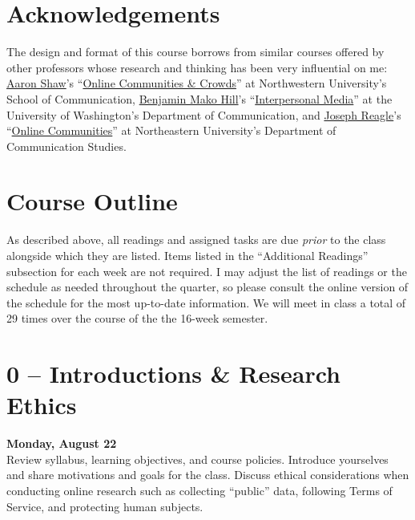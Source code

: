 \documentclass[10pt]{memoir}
\begin{document}
\section{Acknowledgements}
The design and format of this course borrows from similar courses offered by other professors whose research and thinking has been very influential on me: \href{http://aaronshaw.org/}{Aaron Shaw}'s ``\href{http://aaronshaw.org/teaching/2014/occ/syllabus/Shaw-occ-syllabus2014.pdf}{Online Communities \& Crowds}'' at Northwestern University's School of Communication, \href{https://mako.cc/academic/}{Benjamin Mako Hill}'s ``\href{http://wiki.communitydata.cc/Interpersonal_Media_(Fall_2015)}{Interpersonal Media}'' at the University of Washington's Department of Communication, and \href{http://reagle.org/joseph}{Joseph Reagle}'s ``\href{http://reagle.org/joseph/2014/oc/oc-syllabus-FA.html}{Online Communities}'' at Northeastern University's Department of Communication Studies.


\newpage
\section{\textbf{Course Outline}}

As described above, all readings and assigned tasks are due \emph{prior} to the class alongside which they are listed. Items listed in the ``Additional Readings'' subsection for each week are not required. I may adjust the list of readings or the schedule as needed throughout the quarter, so please consult the online version of the schedule for the most up-to-date information. We will meet in class a total of 29 times over the course of the the 16-week semester.



\section{0 -- Introductions \& Research Ethics}
\textcolor{CUGold}{\textbf{Monday, August 22}}\\
Review syllabus, learning objectives, and course policies. Introduce yourselves and share motivations and goals for the class. Discuss ethical considerations when conducting online research such as collecting ``public'' data, following Terms of Service, and protecting human subjects.
\end{document}
